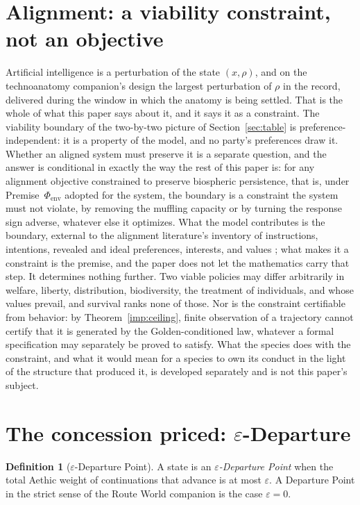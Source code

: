 \documentclass[11pt]{article}
\theoremstyle{plain}
\theoremstyle{definition}
\newtheorem{definition}[theorem]{Definition}
\theoremstyle{remark}
\begin{document}
\section{Alignment: a viability constraint, not an objective}\label{sec:alignment}

Artificial intelligence is a perturbation of the state $(x,\rho)$, and
on the technoanatomy companion's design the largest perturbation of
$\rho$ in the record, delivered during the window in which the
anatomy is being settled. That is the whole of what this paper says
about it, and it says it as a constraint. The viability boundary of the two-by-two picture of
Section~\ref{sec:table} is preference-independent: it is a property of
the model, and no party's preferences draw it. Whether an aligned
system must preserve it is a separate question, and the answer is
conditional in exactly the way the rest of this paper is: for any
alignment objective constrained to preserve biospheric persistence,
that is, under Premise~$\Phi_{\mathrm{env}}$ adopted for the system,
the boundary is a constraint the system must not violate, by removing
the muffling capacity or by turning the response sign adverse, whatever
else it optimizes. What the model contributes is the boundary, external
to the alignment literature's inventory of instructions, intentions,
revealed and ideal preferences, interests, and values
\cite{Gabriel20}; what makes it a constraint is the premise, and the
paper does not let the mathematics carry that step. It determines
nothing further. Two viable policies may differ arbitrarily
in welfare, liberty, distribution, biodiversity, the treatment of
individuals, and whose values prevail, and survival ranks none of
those. Nor is the constraint certifiable from behavior: by
Theorem~\ref{imp:ceiling}, finite observation of a trajectory cannot
certify that it is generated by the Golden-conditioned law, whatever a
formal specification may separately be proved to satisfy. What the
species does with the constraint, and what it would mean for a species
to own its conduct in the light of the structure that produced it, is
developed separately and is not this paper's subject.

\section{The concession priced: $\varepsilon$-Departure}\label{sec:epsilon}

\begin{definition}[$\varepsilon$-Departure Point]\label{gc:def:epsdep}
A state is an \emph{$\varepsilon$-Departure Point} when the total
Aethic weight of continuations that advance is at most $\varepsilon$. A
Departure Point in the strict sense of
the Route World companion \cite{RouteWorld} is the case $\varepsilon=0$.
\end{definition}
\end{document}
